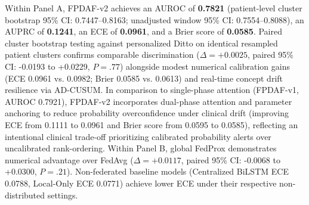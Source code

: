 \documentclass[11pt,a4paper]{article}
\begin{document}
Within Panel A, FPDAF-v2 achieves an AUROC of \textbf{0.7821} (patient-level cluster bootstrap 95\% CI: 0.7447--0.8163; unadjusted window 95\% CI: 0.7554--0.8088), an AUPRC of \textbf{0.1241}, an ECE of \textbf{0.0961}, and a Brier score of \textbf{0.0585}. Paired cluster bootstrap testing against personalized Ditto on identical resampled patient clusters confirms comparable discrimination ($\Delta = +0.0025$, paired 95\% CI: -0.0193 to +0.0229, $P = .77$) alongside modest numerical calibration gains (ECE 0.0961 vs. 0.0982; Brier 0.0585 vs. 0.0613) and real-time concept drift resilience via AD-CUSUM. In comparison to single-phase attention (FPDAF-v1, AUROC 0.7921), FPDAF-v2 incorporates dual-phase attention and parameter anchoring to reduce probability overconfidence under clinical drift (improving ECE from 0.1111 to 0.0961 and Brier score from 0.0595 to 0.0585), reflecting an intentional clinical trade-off prioritizing calibrated probability alerts over uncalibrated rank-ordering. Within Panel B, global FedProx demonstrates numerical advantage over FedAvg ($\Delta = +0.0117$, paired 95\% CI: -0.0068 to +0.0300, $P = .21$). Non-federated baseline models (Centralized BiLSTM ECE 0.0788, Local-Only ECE 0.0771) achieve lower ECE under their respective non-distributed settings.
\end{document}
